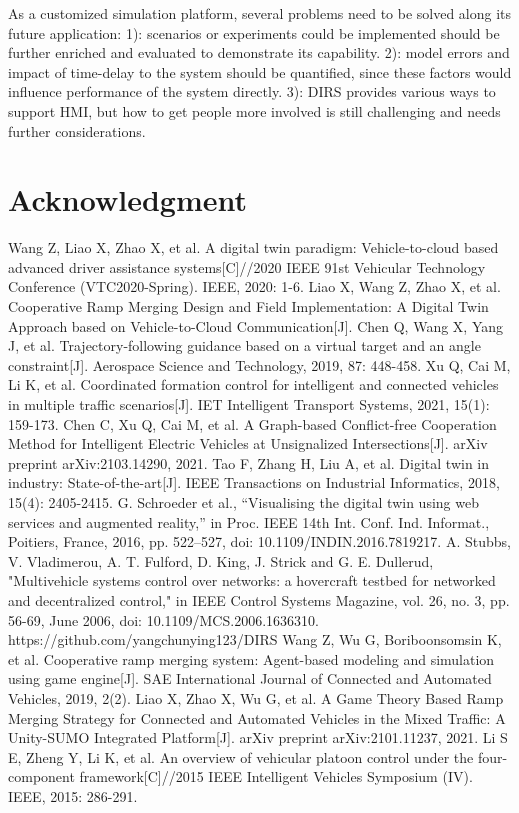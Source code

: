 \documentclass[conference]{IEEEtran}
\begin{document}
	As a customized simulation platform, several problems need to be solved along its future application: 1): scenarios or experiments could be implemented should be further enriched and evaluated to demonstrate its capability. 2): model errors and impact of time-delay to the system should be quantified, since these factors would influence performance of the system directly. 3): DIRS provides various ways to support HMI, but how to get people more involved is still challenging and needs further considerations.
\section{Acknowledgment}


\begin{thebibliography}{99}
 Wang Z, Liao X, Zhao X, et al. A digital twin paradigm: Vehicle-to-cloud based advanced driver assistance systems[C]//2020 IEEE 91st Vehicular Technology Conference (VTC2020-Spring). IEEE, 2020: 1-6.
 Liao X, Wang Z, Zhao X, et al. Cooperative Ramp Merging Design and Field Implementation: A Digital Twin Approach based on Vehicle-to-Cloud Communication[J].
 Chen Q, Wang X, Yang J, et al. Trajectory-following guidance based on a virtual target and an angle constraint[J]. Aerospace Science and Technology, 2019, 87: 448-458.
 Xu Q, Cai M, Li K, et al. Coordinated formation control for intelligent and connected vehicles in multiple traffic scenarios[J]. IET Intelligent Transport Systems, 2021, 15(1): 159-173.
 Chen C, Xu Q, Cai M, et al. A Graph-based Conflict-free Cooperation Method for Intelligent Electric Vehicles at Unsignalized Intersections[J]. arXiv preprint arXiv:2103.14290, 2021.
 Tao F, Zhang H, Liu A, et al. Digital twin in industry: State-of-the-art[J]. IEEE Transactions on Industrial Informatics, 2018, 15(4): 2405-2415.
 G. Schroeder et al., “Visualising the digital twin using web services and
augmented reality,” in Proc. IEEE 14th Int. Conf. Ind. Informat., Poitiers, France, 2016, pp. 522–527, doi: 10.1109/INDIN.2016.7819217.
  A. Stubbs, V. Vladimerou, A. T. Fulford, D. King, J. Strick and G. E. Dullerud, "Multivehicle systems control over networks: a hovercraft testbed for networked and decentralized control," in IEEE Control Systems Magazine, vol. 26, no. 3, pp. 56-69, June 2006, doi: 10.1109/MCS.2006.1636310.
 https://github.com/yangchunying123/DIRS
 Wang Z, Wu G, Boriboonsomsin K, et al. Cooperative ramp merging system: Agent-based modeling and simulation using game engine[J]. SAE International Journal of Connected and Automated Vehicles, 2019, 2(2).
 Liao X, Zhao X, Wu G, et al. A Game Theory Based Ramp Merging Strategy for Connected and Automated Vehicles in the Mixed Traffic: A Unity-SUMO Integrated Platform[J]. arXiv preprint arXiv:2101.11237, 2021.
 Li S E, Zheng Y, Li K, et al. An overview of vehicular platoon control under the four-component framework[C]//2015 IEEE Intelligent Vehicles Symposium (IV). IEEE, 2015: 286-291.
\end{thebibliography}
\vspace{12pt}
\color{red}
\end{document}
